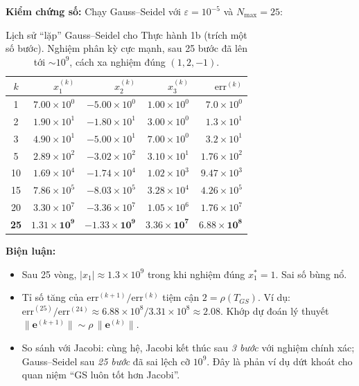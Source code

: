 \documentclass[12pt,a4paper]{article}
\begin{document}
\textbf{Kiểm chứng số:} Chạy Gauss--Seidel với $\varepsilon = 10^{-5}$ và $N_{\max} = 25$:

\begin{table}[H]
    \centering
    \small
    \begin{tabular}{crrrr}
        \toprule
        $k$ & $x_1^{(k)}$ & $x_2^{(k)}$ & $x_3^{(k)}$ & $\mathrm{err}^{(k)}$ \\
        \midrule
        1  & $7.00\times 10^0$ & $-5.00\times 10^0$ & $1.00\times 10^0$ & $7.0\times 10^0$ \\
        2  & $1.90\times 10^1$ & $-1.80\times 10^1$ & $3.00\times 10^0$ & $1.3\times 10^1$ \\
        3  & $4.90\times 10^1$ & $-5.00\times 10^1$ & $7.00\times 10^0$ & $3.2\times 10^1$ \\
        5  & $2.89\times 10^2$ & $-3.02\times 10^2$ & $3.10\times 10^1$ & $1.76\times 10^2$ \\
        10 & $1.69\times 10^4$ & $-1.74\times 10^4$ & $1.02\times 10^3$ & $9.47\times 10^3$ \\
        15 & $7.86\times 10^5$ & $-8.03\times 10^5$ & $3.28\times 10^4$ & $4.26\times 10^5$ \\
        20 & $3.30\times 10^7$ & $-3.36\times 10^7$ & $1.05\times 10^6$ & $1.76\times 10^7$ \\
        \textbf{25} & $\mathbf{1.31\times 10^9}$ & $\mathbf{-1.33\times 10^9}$ & $\mathbf{3.36\times 10^7}$ & $\mathbf{6.88\times 10^8}$ \\
        \bottomrule
    \end{tabular}
    \caption{Lịch sử ``lặp'' Gauss--Seidel cho Thực hành 1b (trích một số bước). Nghiệm phân kỳ cực mạnh, sau 25 bước đã lên tới $\sim 10^9$, cách xa nghiệm đúng $(1, 2, -1)$.}
    \label{tab:1b_gs}
\end{table}

\textbf{Biện luận:}
\begin{itemize}
    \item Sau 25 vòng, $|x_1| \approx 1.3\times 10^9$ trong khi nghiệm đúng $x_1^\ast = 1$. Sai số bùng nổ.
    \item Tỉ số tăng của $\mathrm{err}^{(k+1)}/\mathrm{err}^{(k)}$ tiệm cận $2 = \rho(T_{GS})$. Ví dụ: $\mathrm{err}^{(25)}/\mathrm{err}^{(24)} \approx 6.88\times 10^8 / 3.31\times 10^8 \approx 2.08$. Khớp dự đoán lý thuyết $\|\mathbf{e}^{(k+1)}\| \sim \rho\,\|\mathbf{e}^{(k)}\|$.
    \item So sánh với Jacobi: cùng hệ, Jacobi kết thúc sau \emph{3 bước} với nghiệm chính xác; Gauss--Seidel sau \emph{25 bước} đã sai lệch cỡ $10^9$. Đây là phản ví dụ dứt khoát cho quan niệm ``GS luôn tốt hơn Jacobi''.
\end{itemize}
\end{document}
